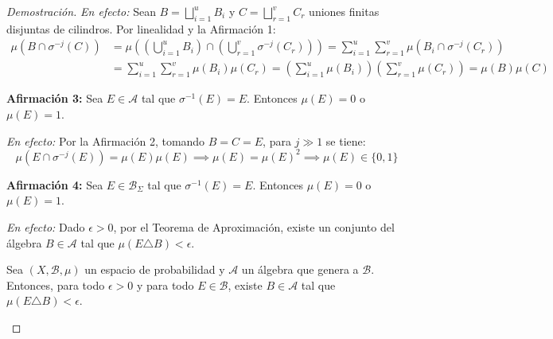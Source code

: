 \begin{proof}[Demostración]
	\textit{En efecto:} Sean $B = \bigsqcup_{i=1}^u B_i$ y $C = \bigsqcup_{r=1}^v C_r$ uniones finitas disjuntas de cilindros. Por linealidad y la Afirmación 1:
	\begin{align*}
		\mu(B \cap \sigma^{-j}(C)) &= \mu \left( \left( \bigcup_{i=1}^u B_i \right) \cap \left( \bigcup_{r=1}^v \sigma^{-j}(C_r) \right) \right) = \sum_{i=1}^u \sum_{r=1}^v \mu(B_i \cap \sigma^{-j}(C_r)) \\
		&= \sum_{i=1}^u \sum_{r=1}^v \mu(B_i)\mu(C_r) = \left( \sum_{i=1}^u \mu(B_i) \right) \left( \sum_{r=1}^v \mu(C_r) \right) = \mu(B)\mu(C)
	\end{align*}
	
	\textbf{Afirmación 3:} Sea $E \in \mathcal{A}$ tal que $\sigma^{-1}(E) = E$. Entonces $\mu(E) = 0$ o $\mu(E) = 1$.
	
	\textit{En efecto:} Por la Afirmación 2, tomando $B = C = E$, para $j \gg 1$ se tiene:
	$$ \mu(E \cap \sigma^{-j}(E)) = \mu(E)\mu(E) \implies \mu(E) = \mu(E)^2 \implies \mu(E) \in \{0, 1\} $$
	
	\textbf{Afirmación 4:} Sea $E \in \mathcal{B}_\Sigma$ tal que $\sigma^{-1}(E) = E$. Entonces $\mu(E) = 0$ o $\mu(E) = 1$.
	
	\textit{En efecto:} Dado $\epsilon > 0$, por el Teorema de Aproximación, existe un conjunto del álgebra $B \in \mathcal{A}$ tal que $\mu(E \triangle B) < \epsilon$.
	
	\begin{teorema}
		Sea $(X, \mathcal{B}, \mu)$ un espacio de probabilidad y $\mathcal{A}$ un álgebra que genera a $\mathcal{B}$. Entonces, para todo $\epsilon > 0$ y para todo $E \in \mathcal{B}$, existe $B \in \mathcal{A}$ tal que $\mu(E \triangle B) < \epsilon$.
	\end{teorema}
	

\end{proof}
